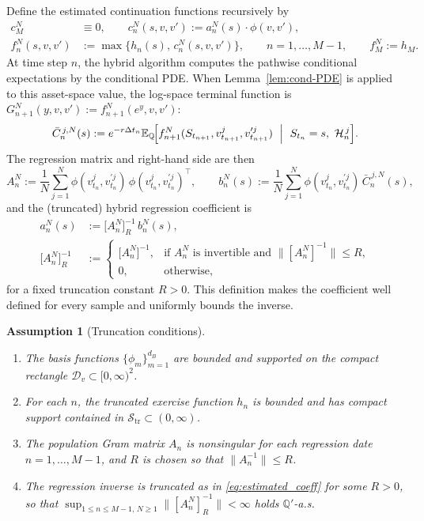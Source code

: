 \documentclass[pdflatex,sn-mathphys-num]{sn-jnl}
\theoremstyle{thmstyleone}%
\theoremstyle{thmstylethree}%
\newtheorem{assumption}[theorem]{Assumption}
\theoremstyle{thmstyletwo}%
\begin{document}
Define the estimated continuation functions recursively by
\[
\begin{aligned}
c_M^N&\equiv 0,\qquad
c_n^N(s,v,v') := a_n^N(s)\cdot \phi(v,v'),\\
f_n^N(s,v,v')&:= \max\{h_n(s),\,c_n^N(s,v,v')\},
\qquad n=1,\dots,M-1,\qquad f_M^N := h_M.
\end{aligned}
\]
At time step $n$, the hybrid algorithm computes the pathwise conditional expectations by the conditional PDE.
When Lemma~\ref{lem:cond-PDE} is applied to this asset-space value, the log-space terminal function is
$G_{n+1}^{N}(y,v,v'):=f_{n+1}^N(e^y,v,v')$:
\[
\bar C_{n}^{\,j,N}(s)
:=
e^{-r\Delta t_n}
\mathbb{E}_{\mathbb{Q}}\!\Bigl[
f_{n+1}^N(S_{t_{n+1}}, v^j_{t_{n+1}}, v^{\prime j}_{t_{n+1}})
\ \Bigm|\ S_{t_n}=s,\ \mathcal H_n^{\,j}
\Bigr].
\]
The regression matrix and right-hand side are then
\[
A_n^N := \frac1N\sum_{j=1}^N \phi(v^j_{t_n},v^{\prime j}_{t_n})\,\phi(v^j_{t_n},v^{\prime j}_{t_n})^\top,
\qquad
b_n^N(s) := \frac1N\sum_{j=1}^N \phi(v^j_{t_n},v^{\prime j}_{t_n})\, \bar C_{n}^{\,j,N}(s),
\]
and the (truncated) hybrid regression coefficient is
\begin{equation}
\begin{aligned}
a_n^N(s)&:= \bigl[A_n^N\bigr]^{-1}_R\, b_n^N(s),\\
\bigl[A_n^N\bigr]^{-1}_R
&:=
\begin{cases}
\bigl[A_n^N\bigr]^{-1}, & \text{if } A_n^N \text{ is invertible and }\|[A_n^N]^{-1}\|\le R,\\
0, & \text{otherwise},
\end{cases}
\end{aligned}
\label{eq:estimated_coeff}
\end{equation}
for a fixed truncation constant $R>0$. This definition makes the
coefficient well defined for every sample and uniformly bounds the inverse.
\medskip


\begin{assumption}[Truncation conditions]
\label{ass:truncation}
\begin{enumerate}
\item The basis functions $\{\phi_m\}_{m=1}^{d_B}$ are bounded and supported on the compact rectangle
$\mathcal{D}_v\subset [0,\infty)^2$.
\item For each $n$, the truncated exercise function $h_n$ is bounded and has compact support contained in
$\mathcal S_{\mathrm{tr}}\subset(0,\infty)$.
\item The population Gram matrix $A_n$ is nonsingular for each regression date $n=1,\dots,M-1$, and $R$ is chosen so that
$\|A_n^{-1}\|\le R$.
\item The regression inverse is truncated as in \eqref{eq:estimated_coeff} for some $R>0$, so that
$\sup_{1\le n\le M-1,\,N\ge 1}\|[A_n^N]^{-1}_R\| <\infty$ holds $\mathbb{Q}'$-a.s.
\end{enumerate}
\end{assumption}
\end{document}
